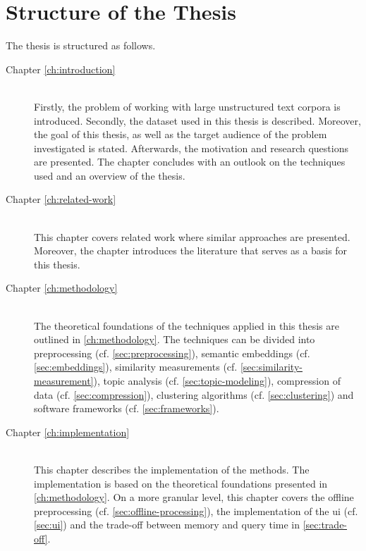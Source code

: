 
\section{Structure of the Thesis}\label{sec:structure-of-the-thesis}
The thesis is structured as follows.

\begin{description}
    \item[Chapter \ref{ch:introduction}] \hfill \\
        Firstly, the problem of working with large unstructured text corpora is introduced.
        Secondly, the dataset used in this thesis is described.
        Moreover, the goal of this thesis, as well as
        the target audience of the problem investigated is stated.
        Afterwards, the motivation and research questions are presented.
        The chapter concludes with an outlook on the techniques used and an overview of the thesis.
    
    \item[Chapter \ref{ch:related-work}] \hfill \\
        This chapter covers related work where similar approaches are presented.
        Moreover, the chapter introduces the literature that serves as a basis for this thesis.

    \item[Chapter \ref{ch:methodology}] \hfill \\
        The theoretical foundations of the techniques applied in this thesis are outlined in \autoref{ch:methodology}.
        The techniques can be divided into preprocessing (cf. \autoref{sec:preprocessing}), 
        semantic embeddings (cf. \autoref{sec:embeddings}), 
        similarity measurements (cf. \autoref{sec:similarity-measurement}),
        topic analysis (cf. \autoref{sec:topic-modeling}),
        compression of data (cf. \autoref{sec:compression}),
        clustering algorithms (cf. \autoref{sec:clustering})
        and software frameworks (cf. \autoref{sec:frameworks}).

    \item[Chapter \ref{ch:implementation}] \hfill \\  
        This chapter describes the implementation of the methods.
        The implementation is based on the theoretical foundations presented in \autoref{ch:methodology}.
        On a more granular level, this chapter covers the offline preprocessing (cf. \autoref{sec:offline-processing}),
        the implementation of the \ac{ui} (cf. \autoref{sec:ui})
        and the trade-off between memory and query time in \autoref{sec:trade-off}.


\end{description}
